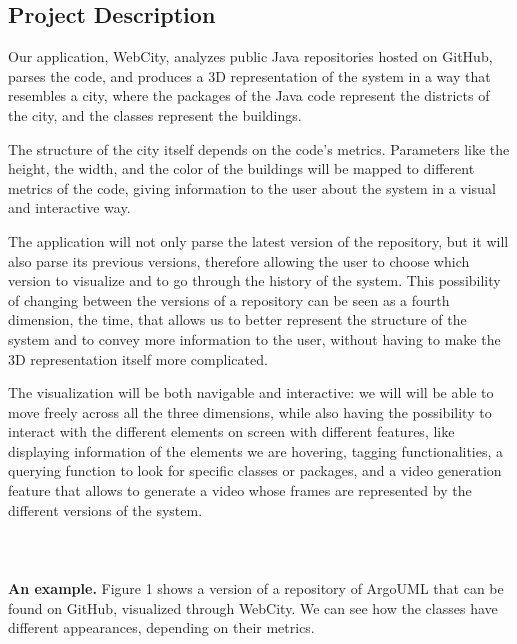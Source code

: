 \documentclass[]{usiinfbachelorproject}
\begin{document}
\subsection{Project Description} \label{Project Description}
Our application, WebCity, analyzes public Java repositories hosted on GitHub, parses the code, and produces a 3D representation of the system in a way that resembles a city, where the packages of the Java code represent the districts of the city, and the classes represent the buildings.

The structure of the city itself depends on the code's metrics. Parameters like the height, the width, and the color of the buildings will be mapped to different metrics of the code, giving information to the user about the system in a visual and interactive way.

The application will not only parse the latest version of the repository, but it will also parse its previous versions, therefore allowing the user to choose which version to visualize and to go through the history of the system. This possibility of changing between the versions of a repository can be seen as a fourth dimension, the time, that allows us to better represent the structure of the system and to convey more information to the user, without having to make the 3D representation itself more complicated.

The visualization will be both navigable and interactive: we will will be able to move freely across all the three dimensions, while also having the possibility to interact with the different elements on screen with different features, like displaying information of the elements we are hovering, tagging functionalities, a querying function to look for specific classes or packages, and a video generation feature that allows to generate a video whose frames are represented by the different versions of the system.\\\\\\\\

\textbf{An example.} Figure 1 shows a version of a repository of ArgoUML that can be found on GitHub, visualized through WebCity. We can see how the classes have different appearances, depending on their metrics.
\end{document}
